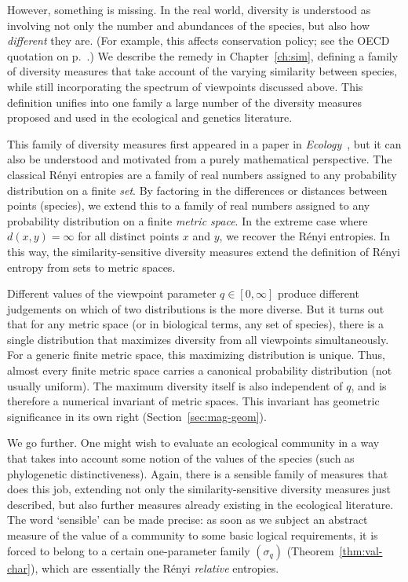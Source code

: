 However, something is missing.  In the real world, diversity is understood
as involving not only the number and abundances of the species, but also
how \emph{different} they are.  (For example, this affects
conservation policy; see the OECD quotation on
p.~\pageref{p:oecd-quote}.)  We describe the remedy in
Chapter~\ref{ch:sim}, defining a family of diversity measures that take
account of the varying similarity%
%
% 
between species, while still incorporating the
spectrum of viewpoints discussed above.  This definition unifies into one
family a large number of the diversity measures proposed and used in the
ecological and genetics literature.

This family of diversity measures first appeared in a paper in
\emph{Ecology}~\cite{MDISS}, but it can also be understood and motivated
from a purely mathematical perspective.  The classical R\'enyi entropies
are a family of real numbers assigned to any probability distribution on a
finite \emph{set}.  By factoring in the differences or distances
between points (species), we extend this to a family of real numbers
assigned to any probability distribution on a finite
\emph{metric space}.
In the extreme case where $d(x, y) = \infty$ for all distinct points $x$
and $y$, we recover the R\'enyi entropies.  In this way, the
similarity-sensitive diversity measures extend the definition of R\'enyi
entropy from sets to metric spaces.

Different values of the viewpoint parameter $q \in [0, \infty]$ produce
different judgements on which of two distributions is the more diverse.
But it turns out that for any metric space (or in biological terms, any
set of species), there is a single distribution that maximizes%
%
% 
diversity from all viewpoints simultaneously.  For a generic finite metric
space, this maximizing distribution is unique.  Thus, almost every finite
metric space carries a canonical probability distribution (not usually
uniform).  The maximum%
%
% 
diversity itself is also independent of $q$, and is therefore a numerical
invariant of metric spaces.  This invariant has geometric significance in
its own right (Section~\ref{sec:mag-geom}).

We go further.  One might wish to evaluate an ecological community in a way
that takes into account some notion of the values of the
species (such as 
phylogenetic distinctiveness).  Again, there is a sensible family of
measures that does this job, extending not only the similarity-sensitive
diversity measures just described, but also further measures already
existing in the ecological literature.  The word `sensible' can be made
precise: as soon as we subject an abstract measure of the value of a
community to some basic logical requirements, it is forced to belong to a
certain one-parameter family $(\sigma_q)$ (Theorem~\ref{thm:val-char}),
which are essentially the R\'enyi \emph{relative} entropies.

